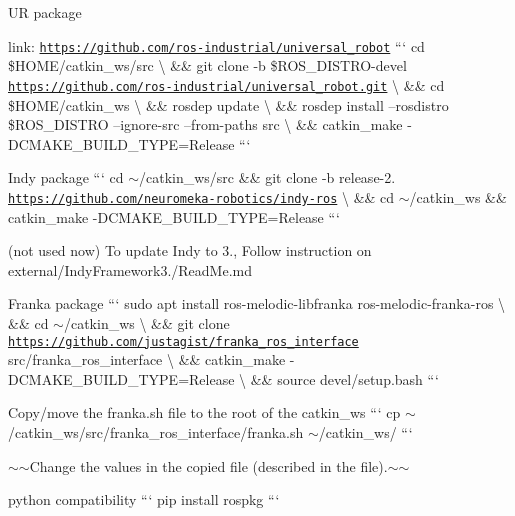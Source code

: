 \begin{DoxyItemize}
\item UR package
\begin{DoxyItemize}
\item link\+: \href{https://github.com/ros-industrial/universal_robot}{\tt https\+://github.\+com/ros-\/industrial/universal\+\_\+robot} ``` cd \$\+H\+O\+ME/catkin\+\_\+ws/src \textbackslash{} \&\& git clone -\/b \$\+R\+O\+S\+\_\+\+D\+I\+S\+T\+RO-\/devel \href{https://github.com/ros-industrial/universal_robot.git}{\tt https\+://github.\+com/ros-\/industrial/universal\+\_\+robot.\+git} \textbackslash{} \&\& cd \$\+H\+O\+ME/catkin\+\_\+ws \textbackslash{} \&\& rosdep update \textbackslash{} \&\& rosdep install --rosdistro \$\+R\+O\+S\+\_\+\+D\+I\+S\+T\+RO --ignore-\/src --from-\/paths src \textbackslash{} \&\& catkin\+\_\+make -\/\+D\+C\+M\+A\+K\+E\+\_\+\+B\+U\+I\+L\+D\+\_\+\+T\+Y\+PE=Release ```
\end{DoxyItemize}
\item Indy package ``` cd $\sim$/catkin\+\_\+ws/src \&\& git clone -\/b release-\/2. \href{https://github.com/neuromeka-robotics/indy-ros}{\tt https\+://github.\+com/neuromeka-\/robotics/indy-\/ros} \textbackslash{} \&\& cd $\sim$/catkin\+\_\+ws \&\& catkin\+\_\+make -\/\+D\+C\+M\+A\+K\+E\+\_\+\+B\+U\+I\+L\+D\+\_\+\+T\+Y\+PE=Release ```
\begin{DoxyItemize}
\item (not used now) To update Indy to 3., Follow instruction on external/\+Indy\+Framework3./\+Read\+Me.md
\end{DoxyItemize}
\item Franka package ``` sudo apt install ros-\/melodic-\/libfranka ros-\/melodic-\/franka-\/ros \textbackslash{} \&\& cd $\sim$/catkin\+\_\+ws \textbackslash{} \&\& git clone \href{https://github.com/justagist/franka_ros_interface}{\tt https\+://github.\+com/justagist/franka\+\_\+ros\+\_\+interface} src/franka\+\_\+ros\+\_\+interface \textbackslash{} \&\& catkin\+\_\+make -\/\+D\+C\+M\+A\+K\+E\+\_\+\+B\+U\+I\+L\+D\+\_\+\+T\+Y\+PE=Release \textbackslash{} \&\& source devel/setup.\+bash ```
\begin{DoxyItemize}
\item Copy/move the franka.\+sh file to the root of the catkin\+\_\+ws ``` cp $\sim$/catkin\+\_\+ws/src/franka\+\_\+ros\+\_\+interface/franka.sh $\sim$/catkin\+\_\+ws/ ```
\item $\sim$$\sim$\+Change the values in the copied file (described in the file).$\sim$$\sim$
\end{DoxyItemize}
\item python compatibility ``` pip install rospkg ``` 
\end{DoxyItemize}